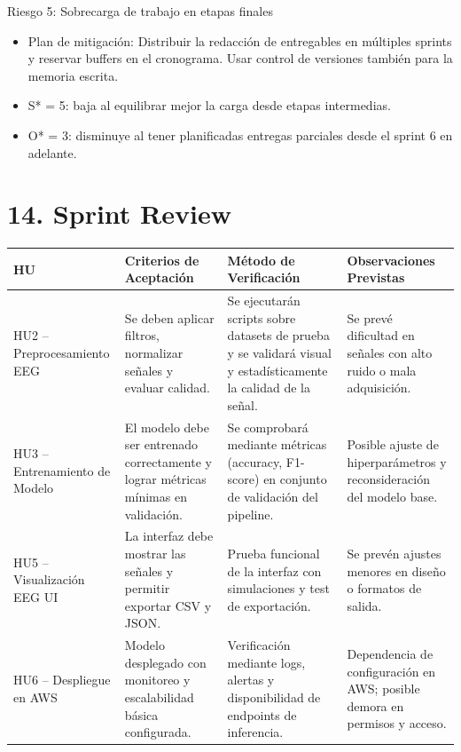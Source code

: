 \documentclass[
11pt, %
]{charter}
\begin{document}
Riesgo 5: Sobrecarga de trabajo en etapas finales
\begin{itemize}
  \item Plan de mitigación: Distribuir la redacción de entregables en múltiples sprints y reservar buffers en el cronograma. Usar control de versiones también para la memoria escrita.
  \item S* = 5: baja al equilibrar mejor la carga desde etapas intermedias.
  \item O* = 3: disminuye al tener planificadas entregas parciales desde el sprint 6 en adelante.
\end{itemize}

\section{14. Sprint Review}
\label{sec:sprint_review}

\renewcommand{\arraystretch}{1.5}
\begin{table}[H]
\centering
\begin{tabularx}{\linewidth}{|>{\raggedright\arraybackslash}p{3.2cm}|
                                >{\raggedright\arraybackslash}p{3.2cm}|
                                >{\raggedright\arraybackslash}X|
                                >{\raggedright\arraybackslash}p{3.2cm}|}
\hline
\rowcolor[HTML]{C0C0C0}
\textbf{HU} & \textbf{Criterios de Aceptación} & \textbf{Método de Verificación} & \textbf{Observaciones Previstas} \\ \hline

HU2 – Preprocesamiento EEG &
Se deben aplicar filtros, normalizar señales y evaluar calidad. &
Se ejecutarán scripts sobre datasets de prueba y se validará visual y estadísticamente la calidad de la señal. &
Se prevé dificultad en señales con alto ruido o mala adquisición. \\ \hline

HU3 – Entrenamiento de Modelo &
El modelo debe ser entrenado correctamente y lograr métricas mínimas en validación. &
Se comprobará mediante métricas (accuracy, F1-score) en conjunto de validación del pipeline. &
Posible ajuste de hiperparámetros y reconsideración del modelo base. \\ \hline

HU5 – Visualización EEG UI &
La interfaz debe mostrar las señales y permitir exportar CSV y JSON. &
Prueba funcional de la interfaz con simulaciones y test de exportación. &
Se prevén ajustes menores en diseño o formatos de salida. \\ \hline

HU6 – Despliegue en AWS &
Modelo desplegado con monitoreo y escalabilidad básica configurada. &
Verificación mediante logs, alertas y disponibilidad de endpoints de inferencia. &
Dependencia de configuración en AWS; posible demora en permisos y acceso. \\ \hline

\end{tabularx}
\end{table}
\vspace{0.5cm}
\end{document}
